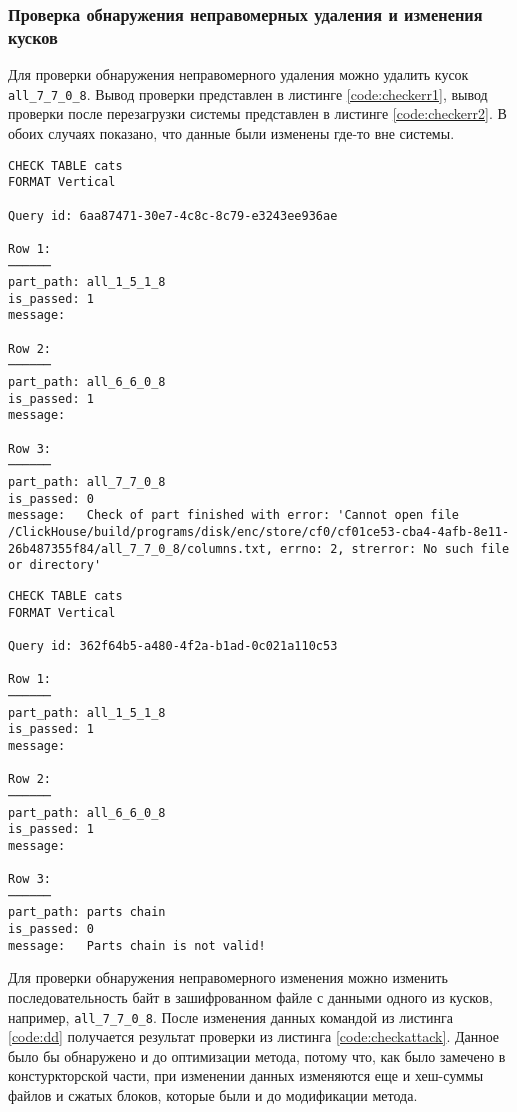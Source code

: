 \subsubsection{Проверка обнаружения неправомерных удаления и изменения кусков}

Для проверки обнаружения неправомерного удаления можно удалить кусок \texttt{all\_7\_7\_0\_8}. Вывод проверки представлен в листинге \ref{code:checkerr1}, вывод проверки после перезагрузки системы представлен в листинге \ref{code:checkerr2}. В обоих случаях показано, что данные были изменены где-то вне системы.

\pagebreak

\begin{lstlisting}[label=code:checkerr1, caption={Вывод системы после неправомерного удаления куска.}]
CHECK TABLE cats
FORMAT Vertical

Query id: 6aa87471-30e7-4c8c-8c79-e3243ee936ae

Row 1:
──────
part_path: all_1_5_1_8
is_passed: 1
message:

Row 2:
──────
part_path: all_6_6_0_8
is_passed: 1
message:

Row 3:
──────
part_path: all_7_7_0_8
is_passed: 0
message:   Check of part finished with error: 'Cannot open file /ClickHouse/build/programs/disk/enc/store/cf0/cf01ce53-cba4-4afb-8e11-26b487355f84/all_7_7_0_8/columns.txt, errno: 2, strerror: No such file or directory'
\end{lstlisting}

\pagebreak

\begin{lstlisting}[label=code:checkerr2, caption={Вывод системы после неправомерного удаления куска после перезагрузки системы.}]
CHECK TABLE cats
FORMAT Vertical

Query id: 362f64b5-a480-4f2a-b1ad-0c021a110c53

Row 1:
──────
part_path: all_1_5_1_8
is_passed: 1
message:

Row 2:
──────
part_path: all_6_6_0_8
is_passed: 1
message:

Row 3:
──────
part_path: parts chain
is_passed: 0
message:   Parts chain is not valid!
\end{lstlisting}

Для проверки обнаружения неправомерного изменения можно изменить последовательность байт в зашифрованном файле с данными одного из кусков, например, \texttt{all\_7\_7\_0\_8}. После изменения данных командой из листинга \ref{code:dd} получается результат проверки из листинга \ref{code:checkattack}. Данное было бы обнаружено и до оптимизации метода, потому что, как было замечено в констуркторской части, при изменении данных изменяются еще и хеш-суммы файлов и сжатых блоков, которые были и до модификации метода.

